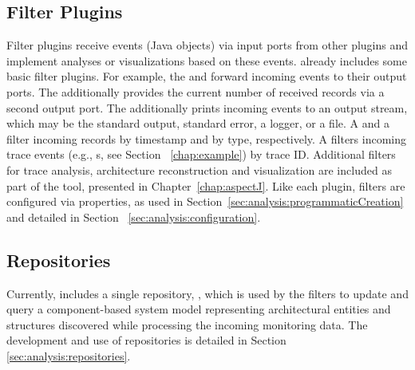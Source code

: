 \subsection{Filter Plugins}

Filter plugins receive events (Java objects) via input ports from other %
plugins and implement analyses or visualizations based on these events. %
\Kieker{} already includes some basic filter plugins. For example, the %
 and   forward incoming events %
to their output ports. The  additionally provides the %
current number of received records via a second output port. The  %
additionally prints incoming events to an output stream, which may be %
the standard output, standard error, a logger, or a file. %
A  and a  filter incoming records by %
timestamp and by type, respectively. A  filters incoming %
trace events (e.g., s, see Section~%
\ref{chap:example}) by trace ID. Additional filters for trace analysis, %
architecture reconstruction and visualization are included as part of %
the \KiekerTraceAnalysis{} tool, presented in Chapter~\ref{chap:aspectJ}. %
Like each plugin, filters are configured %
via properties, as used in Section~\ref{sec:analysis:programmaticCreation} and %
detailed in Section~%
\ref{sec:analysis:configuration}. %

%

% 


\subsection{Repositories}

Currently, \Kieker{} includes a single repository, , %
which is used by the \KiekerTraceAnalysis{} filters to update and query %
a component-based system model representing architectural entities %
and structures discovered while processing the incoming monitoring data. %
The development and use of repositories is detailed in Section~%
\ref{sec:analysis:repositories}. %

